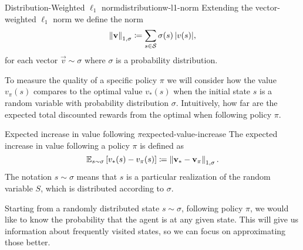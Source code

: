 \begin{dfn}{Distribution-Weighted $\ell_1$ norm}{distributionw-l1-norm}
    Extending the vector-weighted $\ell_1$ norm we define the norm
    \[
        \left\| \mathbf{v} \right\|_{1, \sigma} \coloneqq \sum_{s \in \mathcal{S}} \sigma(s) \, |v(s)|,
    \]
    for each vector $\vec{v} \sim \sigma$ where $\sigma$ is a probability
    distribution.
\end{dfn}

To measure the quality of a specific policy $\pi$ we will consider how the
value $v_\pi(s)$ compares to the optimal value $v_* (s)$ when the initial state
$s$ is a random variable with probability distribution $\sigma$. Intuitively,
how far are the expected total discounted rewards from the optimal when
following policy $\pi$.

\begin{dfn}{Expected increase in value following $\pi$}{expected-value-increase}
    The expected increase in value following a policy $\pi$ is defined as
    \begin{equation}
        \label{eq:expected-value-increase}
        \mathbb{E}_{s \sim \sigma} \left[ v_* (s) - v_\pi (s) \right] \coloneqq \left\| \mathbf{v
        }_* - \mathbf{v}_\pi \right\|_{1, \sigma}.
    \end{equation}
    The notation $s \sim \sigma$ means that $s$ is a particular realization of the
    random variable $S$, which is distributed according to $\sigma$.
\end{dfn}



Starting from a randomly distributed state $s \sim \sigma$, following policy
$\pi$, we would like to know the probability that the agent is at any given
state. This will give us information about frequently visited states, so we can
focus on approximating those better.

